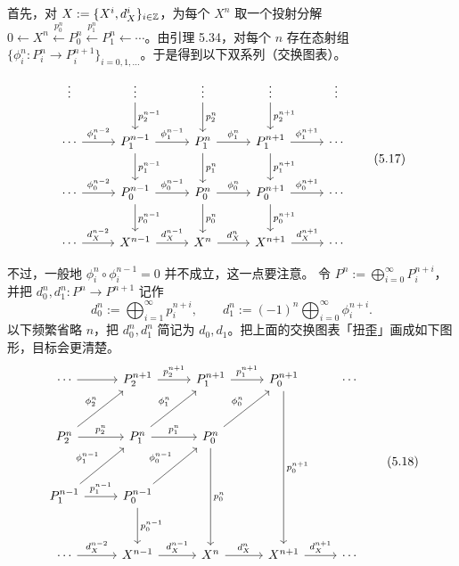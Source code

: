 首先，对 $X:=\{X^i,d_X^i\}_{i\in\mathbb{Z}}$，为每个 $X^n$ 取一个投射分解 $0\leftarrow X^n\xleftarrow{p_0^n}P_0^n\xleftarrow{p_1^n}P_1^n\leftarrow\cdots$。由引理 5.34，对每个 $n$ 存在态射组 $\{\phi_i^n\colon P_i^n\to P_i^{n+1}\}_{i=0,1,\ldots}$。于是得到以下双系列（交换图表）。
\begin{equation}
\begin{tikzcd}[row sep=2.2em, column sep=2.6em]
\vdots & \vdots \arrow[d,"p_2^{n-1}"] & \vdots \arrow[d,"p_2^{n}"] & \vdots \arrow[d,"p_2^{n+1}"] & \vdots \\
\cdots \arrow[r,"\phi_1^{n-2}"] & P_1^{n-1} \arrow[r,"\phi_1^{n-1}"] \arrow[d,"p_1^{n-1}"] & P_1^{n} \arrow[r,"\phi_1^{n}"] \arrow[d,"p_1^{n}"] & P_1^{n+1} \arrow[r,"\phi_1^{n+1}"] \arrow[d,"p_1^{n+1}"] & \cdots \\
\cdots \arrow[r,"\phi_0^{n-2}"] & P_0^{n-1} \arrow[r,"\phi_0^{n-1}"] \arrow[d,"p_0^{n-1}"] & P_0^{n} \arrow[r,"\phi_0^{n}"] \arrow[d,"p_0^{n}"] & P_0^{n+1} \arrow[r,"\phi_0^{n+1}"] \arrow[d,"p_0^{n+1}"] & \cdots \\
\cdots \arrow[r,"d_X^{n-2}"] & X^{n-1} \arrow[r,"d_X^{n-1}"] & X^{n} \arrow[r,"d_X^{n}"] & X^{n+1} \arrow[r,"d_X^{n+1}"] & \cdots
\end{tikzcd} \tag{5.17}
\end{equation}

不过，一般地 $\phi_i^n\circ\phi_i^{n-1}=0$ 并不成立，这一点要注意。
令 $P^n:=\bigoplus_{i=0}^\infty P_i^{n+i}$，并把 $d_0^n,d_1^n\colon P^n\to P^{n+1}$ 记作
\[
  d_0^n:=\bigoplus_{i=1}^\infty p_i^{n+i},\qquad
  d_1^n:=(-1)^n\bigoplus_{i=0}^\infty\phi_i^{n+i}.
\]
以下频繁省略 $n$，把 $d_0^n,d_1^n$ 简记为 $d_0,d_1$。把上面的交换图表「扭歪」画成如下图形，目标会更清楚。
\begin{equation}
\begin{tikzcd}[row sep=2.9em, column sep=2.6em]
\cdots \arrow[r] & P_2^{n+1} \arrow[r,"p_2^{n+1}"] & P_1^{n+1} \arrow[r,"p_1^{n+1}"] & P_0^{n+1} \arrow[ddd,"p_0^{n+1}"] & \cdots \\
P_2^{n} \arrow[r,"p_2^{n}"] \arrow[ur,"\phi_2^{n}"] & P_1^{n} \arrow[r,"p_1^{n}"] \arrow[ur,"\phi_1^{n}"] & P_0^{n} \arrow[ur,"\phi_0^{n}"] \arrow[dd,"p_0^{n}"] & & \\
P_1^{n-1} \arrow[r,"p_1^{n-1}"] \arrow[ur,"\phi_1^{n-1}"] & P_0^{n-1} \arrow[ur,"\phi_0^{n-1}"] \arrow[d,"p_0^{n-1}"] & & & \\
\cdots \arrow[r,"d_X^{n-2}"] & X^{n-1} \arrow[r,"d_X^{n-1}"] & X^{n} \arrow[r,"d_X^{n}"] & X^{n+1} \arrow[r,"d_X^{n+1}"] & \cdots
\end{tikzcd} \tag{5.18}
\end{equation}

